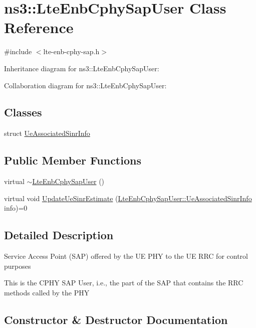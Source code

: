 \hypertarget{classns3_1_1LteEnbCphySapUser}{}\section{ns3\+:\+:Lte\+Enb\+Cphy\+Sap\+User Class Reference}
\label{classns3_1_1LteEnbCphySapUser}


{\ttfamily \#include $<$lte-\/enb-\/cphy-\/sap.\+h$>$}



Inheritance diagram for ns3\+:\+:Lte\+Enb\+Cphy\+Sap\+User\+:


Collaboration diagram for ns3\+:\+:Lte\+Enb\+Cphy\+Sap\+User\+:
\subsection*{Classes}
\begin{DoxyCompactItemize}
\item 
struct \hyperlink{structns3_1_1LteEnbCphySapUser_1_1UeAssociatedSinrInfo}{Ue\+Associated\+Sinr\+Info}
\end{DoxyCompactItemize}
\subsection*{Public Member Functions}
\begin{DoxyCompactItemize}
\item 
virtual \hyperlink{classns3_1_1LteEnbCphySapUser_a302fe90502c5987d4ae497727bff7f75}{$\sim$\+Lte\+Enb\+Cphy\+Sap\+User} ()
\item 
virtual void \hyperlink{classns3_1_1LteEnbCphySapUser_aed0dcd8c1add1b9e51138420ed6d2b1a}{Update\+Ue\+Sinr\+Estimate} (\hyperlink{structns3_1_1LteEnbCphySapUser_1_1UeAssociatedSinrInfo}{Lte\+Enb\+Cphy\+Sap\+User\+::\+Ue\+Associated\+Sinr\+Info} info)=0
\end{DoxyCompactItemize}


\subsection{Detailed Description}
Service Access Point (S\+AP) offered by the UE P\+HY to the UE R\+RC for control purposes

This is the C\+P\+HY S\+AP User, i.\+e., the part of the S\+AP that contains the R\+RC methods called by the P\+HY 

\subsection{Constructor \& Destructor Documentation}

